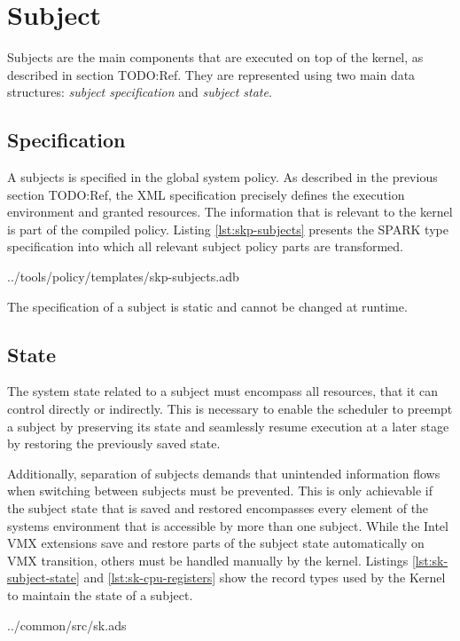 \section{Subject}\label{sec:subject}
Subjects are the main components that are executed on top of the kernel, as
described in section TODO:Ref. They are represented using two main data
structures: \emph{subject specification} and \emph{subject state}.

\subsection{Specification}
A subjects is specified in the global system policy. As described in the
previous section TODO:Ref, the XML specification precisely defines the execution
environment and granted resources. The information that is relevant to the
kernel is part of the compiled policy. Listing \ref{lst:skp-subjects} presents
the SPARK type specification into which all relevant subject policy parts are
transformed.


	{../tools/policy/templates/skp-subjects.adb}

The specification of a subject is static and cannot be changed at runtime.

\subsection{State}
The system state related to a subject must encompass all resources, that it can
control directly or indirectly. This is necessary to enable the scheduler to
preempt a subject by preserving its state and seamlessly resume execution at a
later stage by restoring the previously saved state.

Additionally, separation of subjects demands that unintended information flows
when switching between subjects must be prevented. This is only achievable if
the subject state that is saved and restored encompasses every element of the
systems environment that is accessible by more than one subject. While the Intel
VMX extensions save and restore parts of the subject state automatically on VMX
transition, others must be handled manually by the kernel. Listings
\ref{lst:sk-subject-state} and \ref{lst:sk-cpu-registers} show the record types
used by the Kernel to maintain the state of a subject.


	{../common/src/sk.ads}

